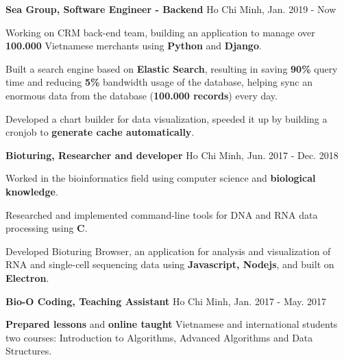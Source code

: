 

\begin{cventries}

  \cvsimpleentry
    {\textbf{Sea Group, Software Engineer - Backend}} %
    {Ho Chi Minh, Jan. 2019 - Now} %
    {
      \begin{cvitems} %
        \item {Working on CRM back-end team, building an application to manage over \textbf{100.000} Vietnamese merchants using \textbf{Python} and \textbf{Django}.}
        \item {Built a search engine based on \textbf{Elastic Search}, resulting in saving \textbf{90\%} query time and reducing \textbf{5\%} bandwidth usage of the database, helping sync an enormous data from the database (\textbf{100.000 records}) every day.}
        \item {Developed a chart builder for data visualization, speeded it up by building a cronjob to \textbf{generate cache automatically}.}
      \end{cvitems}
    }

  \cvsimpleentry
    {\textbf{Bioturing, Researcher and developer}} %
    {Ho Chi Minh, Jun. 2017 - Dec. 2018} %
    {
      \begin{cvitems} %
        \item {Worked in the bioinformatics field using computer science and \textbf{biological knowledge}.}
        \item {Researched and implemented command-line tools for DNA and RNA data processing using \textbf{C}.}
        \item {Developed Bioturing Browser, an application for analysis and visualization of RNA and single-cell sequencing data using \textbf{Javascript, Nodejs}, and built on \textbf{Electron}.}
      \end{cvitems}
    }

  \cvsimpleentry
    {\textbf{Bio-O Coding, Teaching Assistant}} %
    {Ho Chi Minh, Jan. 2017 - May. 2017} %
    {
      \begin{cvitems} %
        \item {\textbf{Prepared lessons} and \textbf{online taught} Vietnamese and international students two courses: Introduction to Algorithms, Advanced Algorithms and Data Structures.}
      \end{cvitems}
    }

\end{cventries}
